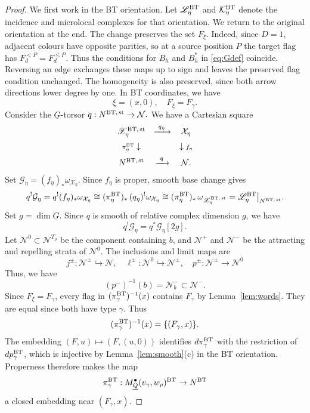 \documentclass[11pt,reqno]{amsart}
\theoremstyle{definition}
\theoremstyle{remark}
\def\dG{\underline G}
\def\dQ{\underline Q}
\def\calN{\mathcal N}
\def\M{\mathfrak M}
\begin{document}
\begin{proof}
We first work in the BT orientation. Let
$\mathscr L_\eta^{\rm BT}$ and $\mathcal K_\eta^{\rm BT}$ denote the
incidence and microlocal complexes for that orientation.
We return to the original orientation at the end. 
The change preserves the set $F_\xi$.
Indeed, since $D=1$, adjacent colours have opposite parities, so at
a source position $P$ the target flag has
$F_d^{<P}=F_d^{\leqslant P}$. Thus the conditions for $B_h$ and $B_h^*$ in
\eqref{eq:Gdef} coincide. Reversing an edge exchanges these maps up
to sign and leaves the preserved flag condition unchanged. 
The homogeneity is also preserved, since both arrow directions lower degree by one.
In BT coordinates, we have
$$\xi=(x,0),\quad F_\xi=F_\gamma.$$
Consider the $\dG$-torsor
$q:N^{\rm BT,\, st}\to\mathcal N.$
We have a Cartesian square
\[
\begin{array}{ccc}
\mathscr X_\eta^{\rm BT,\, st}&\xrightarrow{\ q_\eta\ }&\mathcal X_\eta\\[2mm]
{\scriptstyle\pi_\eta^{\rm BT}}\downarrow&&\downarrow{\scriptstyle f_\eta}\\[2mm]
N^{\rm BT,\, st}&\xrightarrow{\ q\ }&\mathcal N .
\end{array}
\]
Set 
$\mathcal G_\eta=(f_\eta)_*\omega_{\mathcal X_\eta}$.
Since $f_\eta$ is proper, smooth base change gives
\begin{align}\label{GL}
q^!\mathcal G_\eta=q^!(f_\eta)_*\omega_{\mathcal X_\eta}
\cong
(\pi_\eta^{\rm BT})_*\,(q_\eta)^!\omega_{\mathcal X_\eta}
\cong(\pi_\eta^{\rm BT})_*\,\omega_{\mathscr X_\eta^{\rm BT,\, st}}
=\mathscr L_\eta^{\rm BT}\big|_{N^{\rm BT,\, st}}.
\end{align}
Set $g=\dim\dG$. Since $q$ is smooth of relative complex
dimension $g$, we have
\[
q^!\mathcal G_\eta=q^*\mathcal G_\eta[2g].
\]
Let $\mathcal N^0\subset\mathcal N^{T_\rho}$ be the component containing $b$,
and $\mathcal N^+$ and $\mathcal N^-$ be the attracting and repelling strata of $\mathcal N^0$.
The inclusions and limit maps are
$$j^\pm:\mathcal N^\pm\hookrightarrow\mathcal N
,\quad
\ell^\pm:\mathcal N^0\hookrightarrow \mathcal N^\pm
,\quad
p^\pm:\mathcal N^\pm\to \mathcal N^0$$ 
Thus, we have
$$(p^-)^{-1}(b)=\mathcal N_b^-\subset\calN^-.$$
Since $F_\xi=F_\gamma$, every flag in $(\pi_\gamma^{\rm BT})^{-1}(x)$
contains $F_\gamma$ by Lemma~\ref{lem:words}.
They are equal since both have type $\gamma$. 
Thus 
$$(\pi_\gamma^{\rm BT})^{-1}(x)=\{(F_\gamma,x)\}.$$
The embedding $(F,u)\mapsto(F,(u,0))$ identifies $d\pi_\gamma^{\rm BT}$
with the restriction of $dp_\gamma^{\rm BT}$, which is injective by
Lemma~\ref{lem:smooth}(c) in the BT orientation.
Properness therefore makes the map
$$\pi_\gamma^{\rm BT}:\mathscr \M_{\dQ}^\bullet(v_\gamma,w_\rho)^{\rm BT}\to N^{\rm BT}$$ 
a closed embedding near $(F_\gamma,x)$.


\end{proof}
\end{document}
